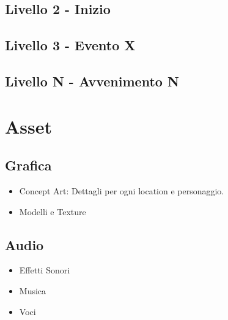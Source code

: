 \documentclass{report}
\begin{document}
\subsection{Livello 2 - Inizio}
\subsection{Livello 3 - Evento X}
\subsection{Livello N - Avvenimento N}

\newpage

\section{Asset}
\subsection{Grafica}
\begin{itemize}
    \item Concept Art: Dettagli per ogni location e personaggio.
    \item Modelli e Texture
\end{itemize}

\subsection{Audio}
\begin{itemize}
    \item Effetti Sonori
    \item Musica
    \item Voci
\end{itemize}
\end{document}
